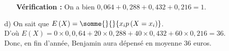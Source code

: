 \begin{itemize}
\begin{itemize}
\begin{itemize}
\textbf{Vérification :} On a bien $0,064 + 0,288 + 0,432 + 0,216 = 1$. \\

\end{itemize}

\item[d)] On sait que $E\left(X\right) = \somme{}{}{x_i p\left(X = x_i\right)}$. \\

D'où $E\left(X\right) = 0 \times 0,0,64 + 20 \times 0,288 + 40 \times 0,432 + 60 \times 0,216 = 36$. \\

Donc, en fin d'année, Benjamin aura dépensé en moyenne $36$ euros. 

\vspace*{-5cm}
\end{itemize}
\vspace*{-5cm}
\end{itemize}

\vspace*{-30cm}